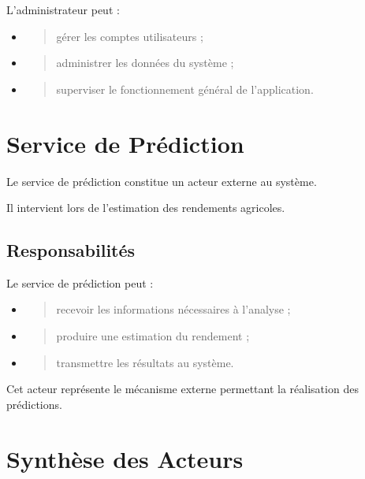 L'administrateur peut :

\begin{itemize}
\item
  \begin{quote}
  gérer les comptes utilisateurs ;
  \end{quote}
\item
  \begin{quote}
  administrer les données du système ;
  \end{quote}
\item
  \begin{quote}
  superviser le fonctionnement général de l'application.
  \end{quote}
\end{itemize}

\hypertarget{service-de-pruxe9diction}{%
\section{Service de Prédiction}\label{service-de-pruxe9diction}}

Le service de prédiction constitue un acteur externe au système.

Il intervient lors de l'estimation des rendements agricoles.

\hypertarget{responsabilituxe9s-3}{%
\subsection{Responsabilités}\label{responsabilituxe9s-3}}

Le service de prédiction peut :

\begin{itemize}
\item
  \begin{quote}
  recevoir les informations nécessaires à l'analyse ;
  \end{quote}
\item
  \begin{quote}
  produire une estimation du rendement ;
  \end{quote}
\item
  \begin{quote}
  transmettre les résultats au système.
  \end{quote}
\end{itemize}

Cet acteur représente le mécanisme externe permettant la réalisation des
prédictions.

\hypertarget{synthuxe8se-des-acteurs}{%
\section{Synthèse des Acteurs}\label{synthuxe8se-des-acteurs}}

